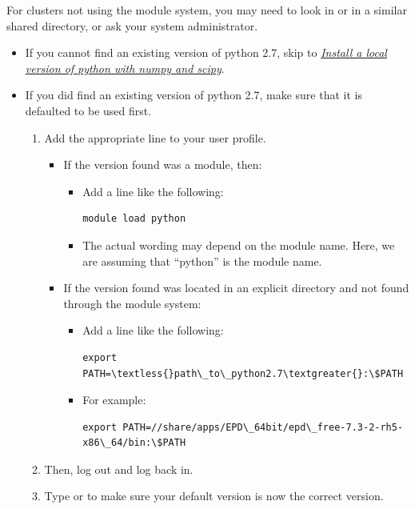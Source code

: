 \documentclass[letterpaper,10pt,english]{sphinxmanual}
\begin{document}
For clusters not using the module system, you may need to look in  or in a similar shared directory, or ask your system administrator.
\begin{itemize}
\item {} 
If you cannot find an existing version of python 2.7, skip to {\hyperref[1_0_installation:install-local-python]{\emph{Install a local version of python with numpy and scipy}}}.

\item {} 
If you did find an existing version of python 2.7, make sure that it is defaulted to be used first.
\begin{enumerate}
\item {} 
Add the appropriate line to your user profile.
\begin{itemize}
\item {} 
If the version found was a module, then:
\begin{itemize}
\item {} 
Add a line like the following:

\begin{Verbatim}[commandchars=\\\{\}]
module load python
\end{Verbatim}

\item {} 
The actual wording may depend on the module name. Here, we are assuming that ``python'' is the module name.

\end{itemize}

\item {} 
If the version found was located in an explicit directory and not found through the module system:
\begin{itemize}
\item {} 
Add a line like the following:

\begin{Verbatim}[commandchars=\\\{\}]
export PATH=\textless{}path\_to\_python2.7\textgreater{}:\$PATH
\end{Verbatim}

\item {} 
For example:

\begin{Verbatim}[commandchars=\\\{\}]
export PATH=//share/apps/EPD\_64bit/epd\_free-7.3-2-rh5-x86\_64/bin:\$PATH
\end{Verbatim}

\end{itemize}

\end{itemize}

\item {} 
Then, log out and log back in.

\item {} 
Type  or  to make sure your default version is now the correct version.

\end{enumerate}

\end{itemize}
\end{document}
